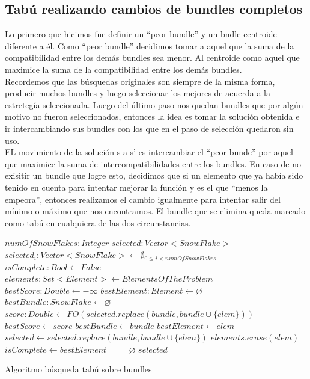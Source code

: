\subsection{Tabú realizando cambios de bundles completos}
Lo primero que hicimos fue definir un ``peor bundle'' y un bndle centroide diferente a él. Como ``peor bundle'' decidimos tomar a aquel que la suma de la compatibilidad entre los demás bundles sea menor. Al centroide como aquel que maximice la suma de la compatibilidad entre los demás bundles.\\
Recordemos que las búsquedas originales son siempre de la misma forma, producir muchos bundles y luego seleccionar los mejores de acuerda a la estretegía seleccionada. Luego del último paso nos quedan bundles que por algún motivo no fueron seleccionados, entonces la idea es tomar la solución obtenida e ir intercambiando sus bundles con los que en el paso de selección quedaron sin uso.\\
EL movimiento de la solución s a s' es intercambiar el ``peor bunde'' por aquel que maximice la suma de intercompatibilidades entre los bundles. En caso de no exisitir un bundle que logre esto, decidimos que si un elemento que ya había sido tenido en cuenta para intentar mejorar la función y es el que ``menos la empeora'', entonces realizamos el cambio igualmente para intentar salir del mínimo o máximo que nos encontramos. El bundle que se elimina queda marcado como tabú en cualquiera de las dos circunstancias.
\begin{algorithm}[H]
\begin{algorithmic}[1]
\REQUIRE $numOfSnowFlakes:Integer$
\ENSURE $selected:Vector<SnowFlake>$
\STATE $selected_{i}:Vector<SnowFlake> \leftarrow \emptyset_{0\leq i<numOfSnowFlakes}$
\STATE $isComplete:Bool \leftarrow False$
\STATE $elements:Set<Element> \leftarrow ElementsOfTheProblem$
  \STATE $bestScore:Double \leftarrow -\infty$
  \STATE $bestElement:Element \leftarrow \varnothing$
  \STATE $bestBundle:SnowFlake \leftarrow \varnothing$
        \STATE $score:Double \leftarrow FO(selected.replace(bundle, bundle \cup \{elem\}))$
          \STATE $bestScore \leftarrow score$
          \STATE $bestBundle \leftarrow bundle$
          \STATE $bestElement \leftarrow elem$
        \ENDIF
      \ENDIF
    \ENDFOR
  \ENDFOR
  \STATE $selected \leftarrow selected.replace(bundle, bundle \cup \{elem\})$
  \STATE $elements.erase(elem)$
  \STATE $isComplete \leftarrow bestElement == \varnothing$
\ENDWHILE
\RETURN $selected$
\end{algorithmic}
\caption{Algoritmo búsqueda tabú sobre bundles}\label{alg:algBusTabuBundle}
\end{algorithm}
